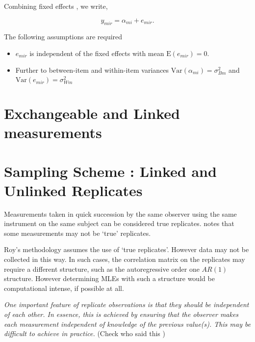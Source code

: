 \documentclass[12pt, a4paper]{report}
\theoremstyle{plain}
\theoremstyle{definition}
\theoremstyle{remark}
\begin{document}
	Combining fixed effects \citep{barnhart}, we write,
	
	\[ y_{mir} = \alpha_{mi} + e_{mir}.\]
	
	The following assumptions are required
	
	\begin{itemize}
		\item $e_{mir}$ is independent of the fixed effects with mean $\mbox{E}(e_{mir}) = 0$.
		\item Further to \citet{barnhart} between-item and within-item variances $\mbox{Var}(\alpha_{mi}) = \sigma^2_{Bm}$ and $\mbox{Var}(e_{mir}) = \sigma^2_{Wm}$
		
	\end{itemize}

	\section{Exchangeable and Linked measurements}
	\section{Sampling Scheme : Linked and Unlinked Replicates}
	Measurements taken in quick succession by the same observer using the same instrument on the same subject can be considered true replicates. \citet{ARoy2009} notes that some measurements may not be `true' replicates.
	
	Roy's methodology assumes the use of `true replicates'. However data may not be collected in this way. In such cases, the correlation matrix on the replicates may require a different structure, such as the autoregressive order one $AR(1)$ structure. However determining MLEs with such a structure would be computational intense, if possible at all.
	
	
	
	\emph{
		One important feature of replicate observations is that they should be independent
		of each other. In essence, this is achieved by ensuring that the observer makes each
		measurement independent of knowledge of the previous value(s). This may be difficult
		to achieve in practice.} (Check who said this
	)
	
\end{document}
